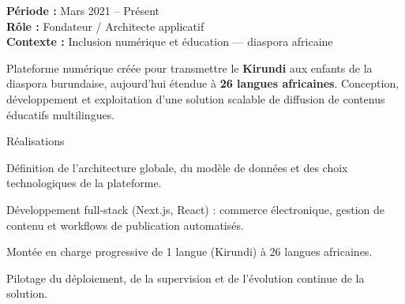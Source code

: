 \begin{cvgroup}

\begin{cvmetadata}
\textbf{Période :} Mars 2021 – Présent \\
\textbf{Rôle :} Fondateur / Architecte applicatif \\
\textbf{Contexte :} Inclusion numérique et éducation — diaspora africaine
\end{cvmetadata}

\begin{cvprojectsummary}
Plateforme numérique créée pour transmettre le \textbf{Kirundi} aux enfants de la diaspora burundaise, aujourd'hui étendue à \textbf{26 langues africaines}. Conception, développement et exploitation d'une solution scalable de diffusion de contenus éducatifs multilingues.
\end{cvprojectsummary}

\begin{cvdetailslist}{Réalisations}
  \item {Définition de l'architecture globale, du modèle de données et des choix technologiques de la plateforme.}
  \item {Développement full-stack (Next.js, React) : commerce électronique, gestion de contenu et workflows de publication automatisés.}
  \item {Montée en charge progressive de 1 langue (Kirundi) à 26 langues africaines.}
  \item {Pilotage du déploiement, de la supervision et de l'évolution continue de la solution.}
\end{cvdetailslist}


\end{cvgroup}
